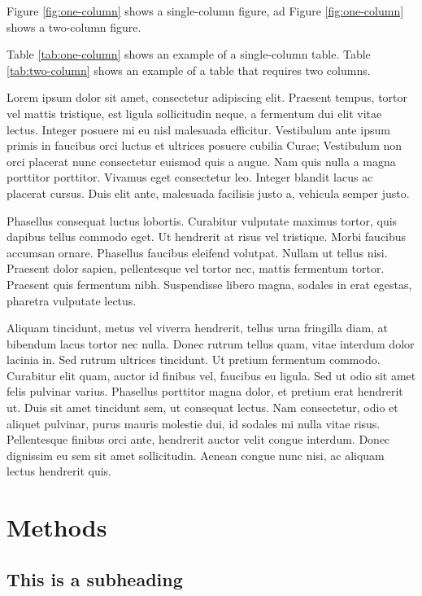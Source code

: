 \documentclass[paper=a4,fontsize=11pt,twocolumn]{article}
\begin{document}
Figure  \ref{fig:one-column} shows a single-column figure,  ad Figure  \ref{fig:one-column} shows a two-column figure. 

Table \ref{tab:one-column} shows an example of a single-column table. Table \ref{tab:two-column} shows an example of a table that requires two columns.

Lorem ipsum dolor sit amet, consectetur adipiscing elit. Praesent tempus, tortor vel mattis tristique, est ligula sollicitudin neque, a fermentum dui elit vitae lectus. Integer posuere mi eu nisl malesuada efficitur. Vestibulum ante ipsum primis in faucibus orci luctus et ultrices posuere cubilia Curae; Vestibulum non orci placerat nunc consectetur euismod quis a augue. Nam quis nulla a magna porttitor porttitor. Vivamus eget consectetur leo. Integer blandit lacus ac placerat cursus. Duis elit ante, malesuada facilisis justo a, vehicula semper justo. 

Phasellus consequat luctus lobortis. Curabitur vulputate maximus tortor, quis dapibus tellus commodo eget. Ut hendrerit at risus vel tristique. Morbi faucibus accumsan ornare. Phasellus faucibus eleifend volutpat. Nullam ut tellus nisi. Praesent dolor sapien, pellentesque vel tortor nec, mattis fermentum tortor. Praesent quis fermentum nibh. Suspendisse libero magna, sodales in erat egestas, pharetra vulputate lectus.

Aliquam tincidunt, metus vel viverra hendrerit, tellus urna fringilla diam, at bibendum lacus tortor nec nulla. Donec rutrum tellus quam, vitae interdum dolor lacinia in. Sed rutrum ultrices tincidunt. Ut pretium fermentum commodo. Curabitur elit quam, auctor id finibus vel, faucibus eu ligula. Sed ut odio sit amet felis pulvinar varius. Phasellus porttitor magna dolor, et pretium erat hendrerit ut. Duis sit amet tincidunt sem, ut consequat lectus. Nam consectetur, odio et aliquet pulvinar, purus mauris molestie dui, id sodales mi nulla vitae risus. Pellentesque finibus orci ante, hendrerit auctor velit congue interdum. Donec dignissim eu sem sit amet sollicitudin. Aenean congue nunc nisi, ac aliquam lectus hendrerit quis.


\section{Methods}
\label{methods}
\subsection{This is a subheading}
\end{document}
